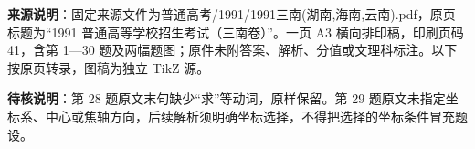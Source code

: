 


\begin{gktip}
\textbf{来源说明}：固定来源文件为普通高考/1991/1991三南(湖南,海南,云南).pdf，原页标题为“1991 普通高等学校招生考试（三南卷）”。一页 A3 横向排印稿，印刷页码 41，含第 1—30 题及两幅题图；原件未附答案、解析、分值或文理科标注。以下按原页转录，图稿为独立 TikZ 源。

\textbf{待核说明}：第 28 题原文末句缺少“求”等动词，原样保留。第 29 题原文未指定坐标系、中心或焦轴方向，后续解析须明确坐标选择，不得把选择的坐标条件冒充题设。
\end{gktip}


